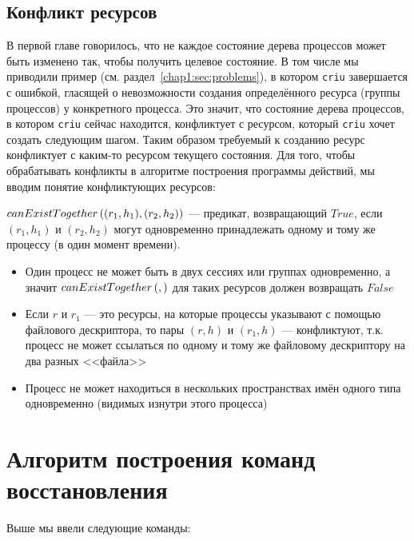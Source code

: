 \subsection{Конфликт ресурсов}
\label{chap2:subsec:conflict}

В первой главе говорилось, что не каждое состояние дерева процессов может быть изменено так, чтобы получить целевое 
состояние. В том числе мы приводили пример (см. раздел~\ref{chap1:sec:problems}), в котором \texttt{criu} завершается 
с ошибкой, гласящей о невозможности создания определённого ресурса (группы процессов) у конкретного процесса. Это 
значит, что состояние дерева процессов, в котором \texttt{criu} сейчас находится, конфликтует с ресурсом, который 
\texttt{criu} хочет создать следующим шагом. Таким образом требуемый к созданию ресурс конфликтует с каким-то ресурсом 
текущего состояния. Для того, чтобы обрабатывать конфликты в алгоритме построения программы действий, мы вводим понятие конфликтующих ресурсов:

\begin{defn}
\label{def:canexist}
$canExistTogether\left( (r_1, h_1), (r_2, h_2) \right)$ --- предикат, возвращающий $True$, если $(r_1, h_1)$ и $(r_2, h_2)$ могут одновременно принадлежать одному и тому же процессу (в один момент времени).
\end{defn}

\begin{exmp}
\begin{itemize}
	\item Один процесс не может быть в двух сессиях или группах одновременно, а значит $canExistTogether\left( ,  \right)$ для таких ресурсов должен возвращать $False$
	\item Если $r$ и $r_1$ --- это ресурсы, на которые процессы указывают с помощью файлового дескриптора, то пары $(r, h)$ и $(r_1, h)$ --- конфликтуют, т.к. процесс не может ссылаться по одному и тому же файловому дескриптору на два разных <<файла>>
	\item Процесс не может находиться в нескольких пространствах имён одного типа одновременно (видимых изнутри этого процесса)
\end{itemize}
\end{exmp}


\section{Алгоритм построения команд восстановления}
\label{chap2:sec:actionsequence}

Выше мы ввели следующие команды:

